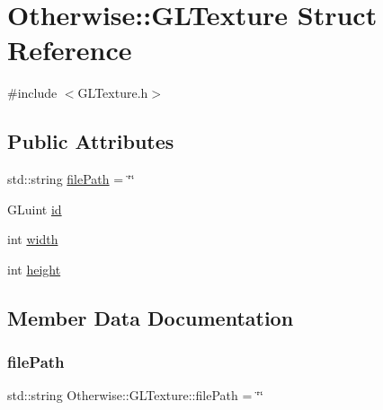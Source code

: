 \hypertarget{struct_otherwise_1_1_g_l_texture}{}\section{Otherwise\+:\+:G\+L\+Texture Struct Reference}
\label{struct_otherwise_1_1_g_l_texture}


{\ttfamily \#include $<$G\+L\+Texture.\+h$>$}

\subsection*{Public Attributes}
\begin{DoxyCompactItemize}
\item 
std\+::string \hyperlink{struct_otherwise_1_1_g_l_texture_a4f7dac20b552b8d3f1196d317e113540}{file\+Path} = \char`\"{}\char`\"{}
\item 
G\+Luint \hyperlink{struct_otherwise_1_1_g_l_texture_ad2a3374e92fc2b9edb60139b2c99e146}{id}
\item 
int \hyperlink{struct_otherwise_1_1_g_l_texture_a7a798338d74d76d719f0058f7cb5b460}{width}
\item 
int \hyperlink{struct_otherwise_1_1_g_l_texture_ab7cc1322279d63b617ff81e59964a0f5}{height}
\end{DoxyCompactItemize}


\subsection{Member Data Documentation}
\mbox{\label{struct_otherwise_1_1_g_l_texture_a4f7dac20b552b8d3f1196d317e113540}} 
\subsubsection{\texorpdfstring{file\+Path}{filePath}}
{\footnotesize\ttfamily std\+::string Otherwise\+::\+G\+L\+Texture\+::file\+Path = \char`\"{}\char`\"{}}

\mbox{\label{struct_otherwise_1_1_g_l_texture_ab7cc1322279d63b617ff81e59964a0f5}} 
